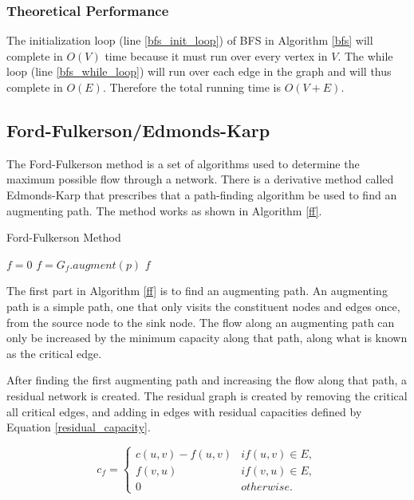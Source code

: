 \documentclass[conference]{IEEEtran}
\begin{document}
\subsubsection{Theoretical Performance}
The initialization loop (line \ref{bfs_init_loop}) of BFS in Algorithm \ref{bfs} 
will complete in $O(V)$ time because it must run over every vertex in $V$. 
The while loop (line \ref{bfs_while_loop}) will run over each edge in the 
graph and will thus complete in $O(E)$. Therefore the total running time is
$O(V+E)$.


\subsection{Ford-Fulkerson/Edmonds-Karp}
The Ford-Fulkerson method is a set of algorithms used to determine the maximum 
possible flow through a network. There is a derivative method called Edmonds-Karp 
that prescribes that a path-finding algorithm be used to find an augmenting path. 
The method works as shown in Algorithm \ref{ff}.
 

\begin{algorithm}
\caption{Ford-Fulkerson Method \cite{b1}}\label{ff}
	\begin{algorithmic}[1]
			\State $f = 0$
				\State $f = G_f.augment(p)$
			\EndWhile
			\State \Return $f$
		\EndFunction
	\end{algorithmic}
\end{algorithm}

The first part in Algorithm \ref{ff} is to find an augmenting path. An augmenting 
path is a simple path, one that only visits the constituent nodes and edges once, 
from the source node to the sink node. The flow along an augmenting path can only be 
increased by the minimum capacity along that path, along what is known as the critical
edge. 

After finding the first augmenting path and increasing the flow along that path, a 
residual network is created. The residual graph is created by removing the critical
all critical edges, and adding in edges with residual capacities defined by Equation 
\ref{residual_capacity}.

\begin{equation}
\label{residual_capacity}
c_f = \begin{cases}
		c(u,v) - f(u,v) & if (u,v) \in E,\\
		f(v,u) & if (v,u) \in E,\\
		0 & otherwise.
	\end{cases}
\end{equation}
\end{document}

